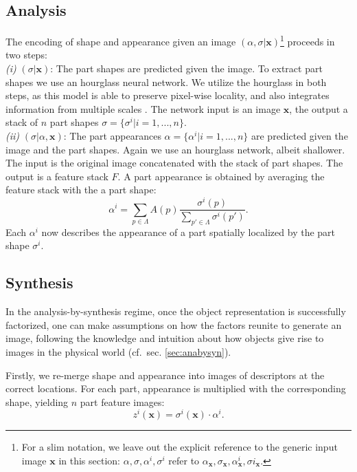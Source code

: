 	\subsection{Analysis}

		The encoding of shape and appearance given an image ${(\alpha, \sigma | \mathbf{x})}$\footnote{ For a slim notation, we leave out the explicit reference to the generic input image $\mathbf{x}$ in this section: $\alpha, \sigma, \alpha^i, {\sigma}^i$ refer to ${\alpha}_\mathbf{x}, {\sigma}_{\mathbf{x}}, \alpha^i_{\mathbf{x}}, {\sigma}i_{\mathbf{x}}$.} proceeds in two steps: \\
		\emph{(i)} $(\sigma |\mathbf{x})$: The part shapes are predicted given the image. To extract part shapes we use an hourglass neural network. We utilize the hourglass in both steps, as this model is able to preserve pixel-wise locality, and also integrates information from multiple scales \cite{newell16hourglass}. The network input is an image $\mathbf{x}$, the output a stack of $n$ part shapes $\sigma =  \{ {\sigma}^i| i=1, ...,  n\}$.\\
		\emph{(ii)} $(\sigma| \alpha , \mathbf{x})$: The part appearances $\alpha =  \{\alpha^i \vert i=1, ...,  n\}$ are predicted given the image and the part shapes. Again we use an hourglass network, albeit shallower. The input is the original image concatenated with the stack of part shapes. The output is a feature stack $F$. A part appearance is obtained by averaging the feature stack with the a part shape:
		\begin{equation}
			\alpha^i = \sum_{p \in \Lambda} A(p) \frac{{\sigma}^i(p)}{\sum_{p' \in \Lambda}{\sigma}^i(p')}.
		\end{equation}
		Each $\alpha^i$ now describes the appearance of a part spatially localized by the part shape ${\sigma}^i$. \\


	\subsection{Synthesis}
		In the analysis-by-synthesis regime, once the object representation is successfully factorized, one can make assumptions on how the factors reunite to generate an image, following the knowledge and intuition about how objects give rise to images in the physical world (cf.\ sec. \ref{sec:anabysyn}).


		Firstly, we re-merge shape and appearance into images of descriptors at the correct locations. For each part, appearance is multiplied with the corresponding shape, yielding $n$ part feature images:
		\begin{equation}
			z^i(\mathbf{x}) = {\sigma}^i(\mathbf{x}) \cdot \alpha^i .
		\end{equation}



